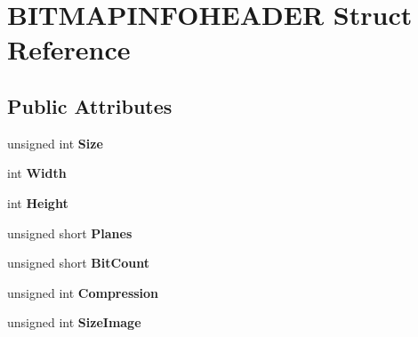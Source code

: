 \hypertarget{struct_b_i_t_m_a_p_i_n_f_o_h_e_a_d_e_r}{}\section{B\+I\+T\+M\+A\+P\+I\+N\+F\+O\+H\+E\+A\+D\+E\+R Struct Reference}
\label{struct_b_i_t_m_a_p_i_n_f_o_h_e_a_d_e_r}
\subsection*{Public Attributes}
\begin{DoxyCompactItemize}
\item 
\hypertarget{struct_b_i_t_m_a_p_i_n_f_o_h_e_a_d_e_r_a9d7b48fd1bb8aca4e83bc943bff31282}{}unsigned int {\bfseries Size}\label{struct_b_i_t_m_a_p_i_n_f_o_h_e_a_d_e_r_a9d7b48fd1bb8aca4e83bc943bff31282}

\item 
\hypertarget{struct_b_i_t_m_a_p_i_n_f_o_h_e_a_d_e_r_a71d17cf240d5f3bf377fb853aa1090b0}{}int {\bfseries Width}\label{struct_b_i_t_m_a_p_i_n_f_o_h_e_a_d_e_r_a71d17cf240d5f3bf377fb853aa1090b0}

\item 
\hypertarget{struct_b_i_t_m_a_p_i_n_f_o_h_e_a_d_e_r_a8852fae7933174a603effd2fecd1aa2c}{}int {\bfseries Height}\label{struct_b_i_t_m_a_p_i_n_f_o_h_e_a_d_e_r_a8852fae7933174a603effd2fecd1aa2c}

\item 
\hypertarget{struct_b_i_t_m_a_p_i_n_f_o_h_e_a_d_e_r_a54f3ec590e0a71f378a7fe869220dead}{}unsigned short {\bfseries Planes}\label{struct_b_i_t_m_a_p_i_n_f_o_h_e_a_d_e_r_a54f3ec590e0a71f378a7fe869220dead}

\item 
\hypertarget{struct_b_i_t_m_a_p_i_n_f_o_h_e_a_d_e_r_af3f14b3f843d6a75dd3f7b43bf9ce89b}{}unsigned short {\bfseries Bit\+Count}\label{struct_b_i_t_m_a_p_i_n_f_o_h_e_a_d_e_r_af3f14b3f843d6a75dd3f7b43bf9ce89b}

\item 
\hypertarget{struct_b_i_t_m_a_p_i_n_f_o_h_e_a_d_e_r_ae415b38fbfee4d1271cf7389f608e67e}{}unsigned int {\bfseries Compression}\label{struct_b_i_t_m_a_p_i_n_f_o_h_e_a_d_e_r_ae415b38fbfee4d1271cf7389f608e67e}

\item 
\hypertarget{struct_b_i_t_m_a_p_i_n_f_o_h_e_a_d_e_r_aed584e55de757c6d91f0c9d9d09cc118}{}unsigned int {\bfseries Size\+Image}\label{struct_b_i_t_m_a_p_i_n_f_o_h_e_a_d_e_r_aed584e55de757c6d91f0c9d9d09cc118}


\end{DoxyCompactItemize}
